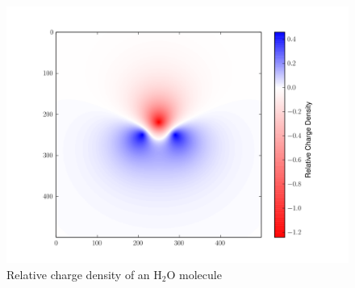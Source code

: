 \begin{figure}[ht]
\centering
\includegraphics[width=12cm]{waterRho.png}
\caption{Relative charge density of an H$_2$O molecule}
\label{figure3}
\end{figure}

